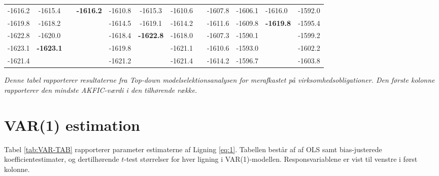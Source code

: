 \documentclass[
  a4paper,
  oneside]{memoir}
\begin{document}
\begin{landscape}
\begin{table}[H]
\begin{threeparttable}
\begin{tabular}[t]{lccccccccclc}
\rowcolor{gray!6}  -1616.2 & -1615.4 &  & \textbf{-1616.2} & -1610.8 & -1615.3 & -1610.6 &  & -1607.8 & -1606.1 & -1616.0 & -1592.0\\
 
-1619.8 & -1618.2 &  &  & -1614.5 & -1619.1 & -1614.2 &  & -1611.6 & -1609.8 & \textbf{-1619.8} & -1595.4\\
 
\rowcolor{gray!6}  -1622.8 & -1620.0 &  &  & -1618.4 & \textbf{-1622.8} & -1618.0 &  & -1607.3 & -1590.1 &  & -1599.2\\
 
-1623.1 & \textbf{-1623.1} &  &  & -1619.8 &  & -1621.1 &  & -1610.6 & -1593.0 &  & -1602.2\\
 
\rowcolor{gray!6}  -1621.4 &  &  &  & -1621.2 &  & -1621.4 &  & -1614.2 & -1596.7 &  & -1603.8\\
\bottomrule
\end{tabular}
\begin{tablenotes}
\item \textit{Denne tabel rapporterer resultaterne fra \textit{Top-down} modelselektionsanalysen for merafkastet på virksomhedsobligationer. Den første kolonne rapporterer den mindste AKFIC-værdi i den tilhørende række.}
\end{tablenotes}
\end{threeparttable}
\end{table}
\end{landscape}

\hypertarget{var1est}{%
\section{VAR(1) estimation}\label{var1est}}

Tabel \ref{tab:VAR-TAB} rapporterer parameter estimaterne af Ligning \eqref{eq:1}. Tabellen består af af OLS samt bias-justerede koefficientestimater, og dertilhørende \(t\)-test størrelser for hver ligning i VAR(1)-modellen. Responsvariablene er vist til venstre i først kolonne.
\end{document}
